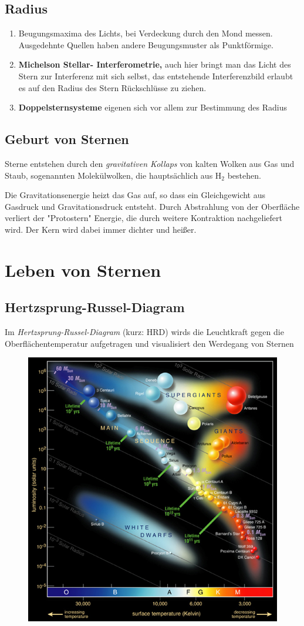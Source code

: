 \documentclass[final]{summery_5.0}
\begin{document}
\subsection{Radius}
\begin{enumerate}
    \item Beugungsmaxima des Lichts, bei Verdeckung durch den Mond messen. Ausgedehnte Quellen haben andere Beugungsmuster als Punktförmige.
    \item {\bf Michelson Stellar-
    Interferometrie, } auch hier bringt man das Licht des Stern zur Interferenz mit sich selbst, das entstehende Interferenzbild erlaubt es auf den Radius des Stern Rückschlüsse zu ziehen.
    \item{ \bf Doppelsternsysteme} eigenen sich vor allem zur Bestimmung des Radius
\end{enumerate}

\subsection{Geburt von Sternen}
Sterne entstehen durch den \emph{gravitativen Kollaps} von kalten Wolken aus
Gas und Staub, sogenannten Molekülwolken, die hauptsächlich aus H${}_2$
bestehen.

Die Gravitationsenergie heizt das Gas auf, so dass ein Gleichgewicht aus
Gasdruck und Gravitationsdruck entsteht. Durch Abstrahlung von der
Oberfläche verliert der "Protostern" Energie, die durch weitere Kontraktion
nachgeliefert wird. Der Kern wird dabei immer dichter und heißer.

\section{Leben von Sternen}
\subsection{Hertzsprung-Russel-Diagram}
Im \emph{Hertzsprung-Russel-Diagram} (kurz: HRD) wirds die Leuchtkraft gegen die Oberflächentemperatur aufgetragen und visualisiert den Werdegang von Sternen
\begin{figure}[H]
    \centering
    \includegraphics[width=.6\textwidth]{Hertzsprung-Russel.png}
\end{figure}
\end{document}
